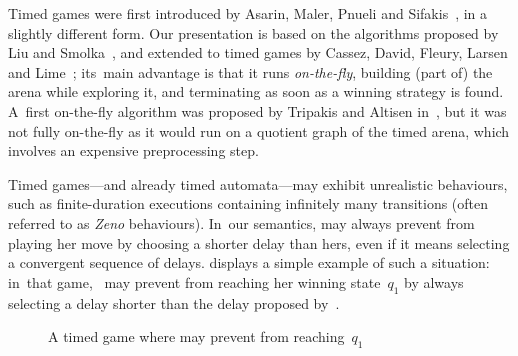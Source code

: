 Timed games were first introduced by Asarin, Maler, Pnueli and Sifakis~\cite{MPS95,AMPS98}, in a
slightly different form.  Our presentation is based on the algorithms
proposed by Liu and Smolka~\cite{LS98}, and extended to timed games by
Cassez, David, Fleury, Larsen and Lime~\cite{CDFLL05};
its~main advantage is that it runs \emph{on-the-fly}, building (part
of) the arena while exploring it, and terminating as soon as a winning
strategy is found.  A~first on-the-fly algorithm was proposed by Tripakis and Altisen
in~\cite{TA99}, but it was not fully on-the-fly as it would run on a
quotient graph of the timed arena, which involves an expensive
preprocessing step.



Timed games---and already timed automata---may exhibit unrealistic
behaviours, such as finite-duration executions containing infinitely
many transitions (often referred to as \emph{Zeno} behaviours).
In~our semantics, \Adam may always prevent \Eve from playing her move
by choosing a shorter delay than hers, even if it means selecting a convergent
sequence of delays.  displays a simple example of
such a situation: in~that game, \Adam~may prevent \Eve from reaching her
winning state~$q_1$ by always selecting a delay shorter than the delay
proposed by~\Eve.

\begin{figure}[ht]
  \centering
  \caption{A timed game where \Adam may prevent \Eve from reaching~$q_1$}
  \label{10-fig:exzeno}
\end{figure}

